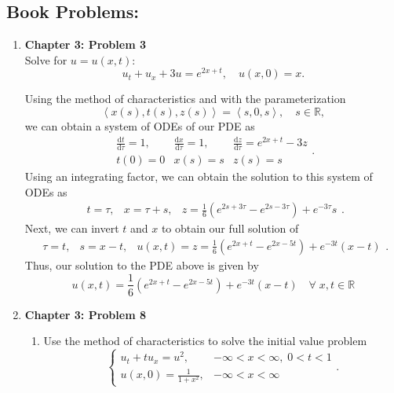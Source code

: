 \documentclass[a4paper,12pt]{article}
\newcommand{\reals}{\mathbb{R}}
\newcommand{\dd}{\mathrm{d}}
\begin{document}
\subsection*{Book Problems:}
\begin{enumerate}[label = \arabic*.]
	\item \textbf{Chapter 3: Problem 3} \\
		Solve for $ u = u(x,t): $
		\[
			u_t + u_x + 3u = e^{2x + t}, \quad u(x,0) = x.
		\]
		
		Using the method of characteristics and with the parameterization
		\[
			\left\langle x(s), t(s), z(s) \right\rangle = \left\langle s, 0, s \right\rangle, \quad s \in \reals,
		\]
		we can obtain a system of ODEs of our PDE as
		\[
			\begin{array}{ccc}
				\frac{\dd t}{\dd \tau} = 1, & \frac{\dd x}{\dd \tau} = 1, & \frac{\dd z}{\dd \tau} =  e^{2x + t} - 3z \\
				t(0) = 0 & x(s) = s & z(s) = s
			\end{array}.
		\]
		Using an integrating factor, we can obtain the solution to this system of ODEs as
		\[
			\begin{array}{ccc}
				t = \tau, & x = \tau + s, & z = \frac{1}{6} \left(e^{2s + 3\tau} - e^{2s - 3\tau}\right) + e^{-3\tau}s
			\end{array}.
		\]
		Next, we can invert $ t $ and $ x $ to obtain our full solution of
		\[
			\begin{array}{ccc}
				\tau = t, & s = x - t, & u(x,t) = z = \frac{1}{6} \left(e^{2x + t} - e^{2x - 5t}\right) + e^{-3t}(x - t)
			\end{array}.
		\]
		Thus, our solution to the PDE above is given by 
		\[
			 u(x,t) = \frac{1}{6} \left(e^{2x + t} - e^{2x - 5t}\right) + e^{-3t}(x - t)\quad \forall\; x,t \in \reals
		\]
    \item \textbf{Chapter 3: Problem 8}
    	\begin{enumerate}[label = (\alph*)]
    		\item Use the method of characteristics to solve the initial value problem
    		\[
    			\begin{cases}
    				u_t + t u_x = u^2, & -\infty < x < \infty, \; 0 < t < 1 \\
    				u(x, 0) = \frac{1}{1 + x^2}, & -\infty < x < \infty
    			\end{cases}.
    		\]
    		

\end{enumerate}
\end{enumerate}
\end{document}
